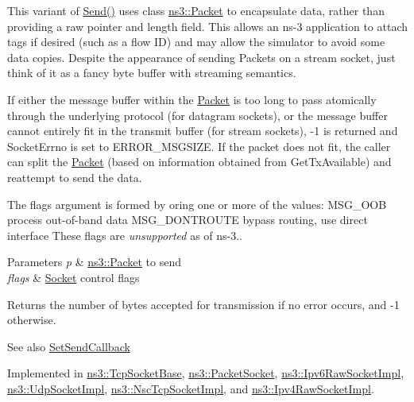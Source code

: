This variant of \hyperlink{classns3_1_1Socket_a036901c8f485fe5b6eab93b7f2ec289d}{Send()} uses class \hyperlink{classns3_1_1Packet}{ns3\+::\+Packet} to encapsulate data, rather than providing a raw pointer and length field. This allows an ns-\/3 application to attach tags if desired (such as a flow ID) and may allow the simulator to avoid some data copies. Despite the appearance of sending Packets on a stream socket, just think of it as a fancy byte buffer with streaming semantics.

If either the message buffer within the \hyperlink{classns3_1_1Packet}{Packet} is too long to pass atomically through the underlying protocol (for datagram sockets), or the message buffer cannot entirely fit in the transmit buffer (for stream sockets), -\/1 is returned and Socket\+Errno is set to E\+R\+R\+O\+R\+\_\+\+M\+S\+G\+S\+I\+ZE. If the packet does not fit, the caller can split the \hyperlink{classns3_1_1Packet}{Packet} (based on information obtained from Get\+Tx\+Available) and reattempt to send the data.

The flags argument is formed by or\textquotesingle{}ing one or more of the values\+: M\+S\+G\+\_\+\+O\+OB process out-\/of-\/band data M\+S\+G\+\_\+\+D\+O\+N\+T\+R\+O\+U\+TE bypass routing, use direct interface These flags are {\itshape unsupported} as of ns-\/3..


\begin{DoxyParams}{Parameters}
{\em p} & \hyperlink{classns3_1_1Packet}{ns3\+::\+Packet} to send \\
\hline
{\em flags} & \hyperlink{classns3_1_1Socket}{Socket} control flags \\
\hline
\end{DoxyParams}
\begin{DoxyReturn}{Returns}
the number of bytes accepted for transmission if no error occurs, and -\/1 otherwise.
\end{DoxyReturn}
\begin{DoxySeeAlso}{See also}
\hyperlink{classns3_1_1Socket_a85ff5c8cc7d242823f301b49264c68a4}{Set\+Send\+Callback} 
\end{DoxySeeAlso}


Implemented in \hyperlink{classns3_1_1TcpSocketBase_a172e373bab86078af4462fc1415c59e4}{ns3\+::\+Tcp\+Socket\+Base}, \hyperlink{classns3_1_1PacketSocket_a1fd81b9271758334d6abad658580b1a0}{ns3\+::\+Packet\+Socket}, \hyperlink{classns3_1_1Ipv6RawSocketImpl_a889224d7c084b74b3a1a3511899a04f3}{ns3\+::\+Ipv6\+Raw\+Socket\+Impl}, \hyperlink{classns3_1_1UdpSocketImpl_ac8e23c2e48d59b943ad5beda3c9b9cce}{ns3\+::\+Udp\+Socket\+Impl}, \hyperlink{classns3_1_1NscTcpSocketImpl_a1623a6154bf55e526dfccdc90edd73bd}{ns3\+::\+Nsc\+Tcp\+Socket\+Impl}, and \hyperlink{classns3_1_1Ipv4RawSocketImpl_ae43d27d4aa516a4cacbe8f0f4f688110}{ns3\+::\+Ipv4\+Raw\+Socket\+Impl}.



